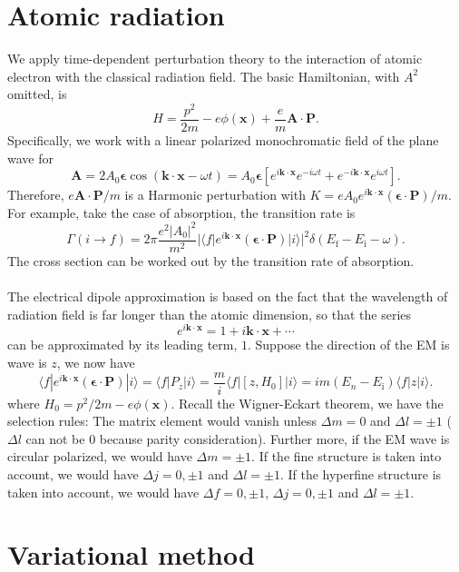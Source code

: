 \section{Atomic radiation}
We apply time-dependent perturbation theory to the interaction of atomic electron with the classical radiation field.
The basic Hamiltonian, with $A^2$ omitted, is
\[H = \frac{p^2}{2m} - e\phi(\bm{x}) + \frac{e}{m}\bm{A}\cdot\bm{P}.\]
Specifically, we work with a linear polarized monochromatic field of the plane wave for
\[\bm{A} = 2A_0\bm{\epsilon}\cos(\bm{k}\cdot\bm{x}-\omega t) = A_0\bm{\epsilon} [e^{i\bm{k}\cdot\bm{x}}e^{-i\omega t}  + e^{-i\bm{k}\cdot\bm{x}}e^{i\omega t} ].\]
Therefore, ${e}\bm{A}\cdot\bm{P} / m$ is a Harmonic perturbation with $K = {eA_0} e^{i\bm{k}\cdot\bm{x}} (\bm{\epsilon}\cdot\bm{P})/m$.
For example, take the case of absorption, the transition rate is
\[\Gamma(i \to f) = 2\pi \frac{e^2|A_0|^2}{m^2} |\langle f |e^{i\bm{k}\cdot\bm{x}} (\bm{\epsilon}\cdot\bm{P}) |i \rangle|^2 \delta(E_{\mathrm{f}}-E_{\mathrm{i}}-\omega).\]
The cross section can be worked out by the transition rate of absorption.
\\ \\
The electrical dipole approximation is based on the fact that the wavelength of radiation field is far longer than the atomic dimension, so that the series
\[e^{i\bm{k}\cdot\bm{x}} = 1+ i\bm{k}\cdot\bm{x}+\cdots\]
can be approximated by its leading term, $1$. Suppose the direction of the EM is wave is $z$, we now have
\[\langle f |e^{i\bm{k}\cdot\bm{x}} (\bm{\epsilon}\cdot\bm{P}) |i \rangle = \langle f | P_z |i \rangle = \frac{m}{i} \langle f |  [z,H_0] |i \rangle = im(E_n-E_{\mathrm{i}})\langle f | z |i \rangle  .\]
where $H_0 = {p^2}/{2m} - e\phi(\bm{x})$.
Recall the Wigner-Eckart theorem, we have the selection rules: The matrix element would vanish unless $\Delta m = 0$ and $\Delta l = \pm 1$ ($\Delta l $ can not be $0$ because parity consideration). Further more, if the EM wave is circular polarized, we would have $\Delta m = \pm 1$. If the fine structure is taken into account, we would have $\Delta j = 0,\pm 1$ and $\Delta l = \pm 1$. If the hyperfine structure is taken into account, we would have $\Delta f = 0,\pm 1$, $\Delta j = 0,\pm 1$ and $\Delta l = \pm 1$.

\section{Variational method}
